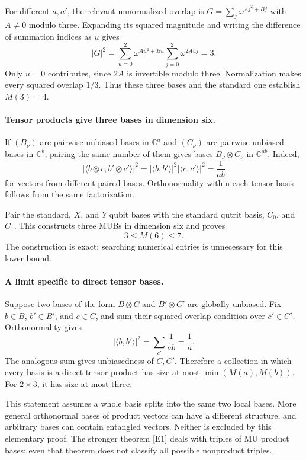 \documentclass[11pt]{article}
\begin{document}
For different $a,a'$, the relevant unnormalized overlap is
$G=\sum_j\omega^{Aj^2+Bj}$ with $A\ne0$ modulo three. Expanding its squared magnitude and writing the difference of summation indices as $u$ gives
\[
 |G|^2=\sum_{u=0}^2\omega^{Au^2+Bu}
                   \sum_{j=0}^2\omega^{2Auj}=3.
\]
Only $u=0$ contributes, since $2A$ is invertible modulo three. Normalization makes every squared overlap $1/3$. Thus these three bases and the standard one establish $M(3)=4$.

\paragraph{Tensor products give three bases in dimension six.}
If $(B_\nu)$ are pairwise unbiased bases in $\mathbb C^a$ and $(C_\nu)$ are pairwise unbiased bases in $\mathbb C^b$, pairing the same number of them gives bases $B_\nu\otimes C_\nu$ in $\mathbb C^{ab}$. Indeed,
\[
 |\langle b\otimes c,b'\otimes c'\rangle|^2
 =|\langle b,b'\rangle|^2|\langle c,c'\rangle|^2
 =\frac1{ab}
\]
for vectors from different paired bases. Orthonormality within each tensor basis follows from the same factorization.

Pair the standard, $X$, and $Y$ qubit bases with the standard qutrit basis, $C_0$, and $C_1$. This constructs three MUBs in dimension six and proves
\[
 3\le M(6)\le7.
 \tag{435.1}
\]
The construction is exact; searching numerical entries is unnecessary for this lower bound.

\paragraph{A limit specific to direct tensor bases.}
Suppose two bases of the form $B\otimes C$ and $B'\otimes C'$ are globally unbiased. Fix $b\in B$, $b'\in B'$, and $c\in C$, and sum their squared-overlap condition over $c'\in C'$. Orthonormality gives
\[
 |\langle b,b'\rangle|^2
 =\sum_{c'}\frac1{ab}=\frac1a.
\]
The analogous sum gives unbiasedness of $C,C'$. Therefore a collection in which every basis is a direct tensor product has size at most $\min(M(a),M(b))$. For $2\times3$, it has size at most three.

This statement assumes a whole basis splits into the same two local bases. More general orthonormal bases of product vectors can have a different structure, and arbitrary bases can contain entangled vectors. Neither is excluded by this elementary proof. The stronger theorem [E1] deals with triples of MU product bases; even that theorem does not classify all possible nonproduct triples.
\end{document}

